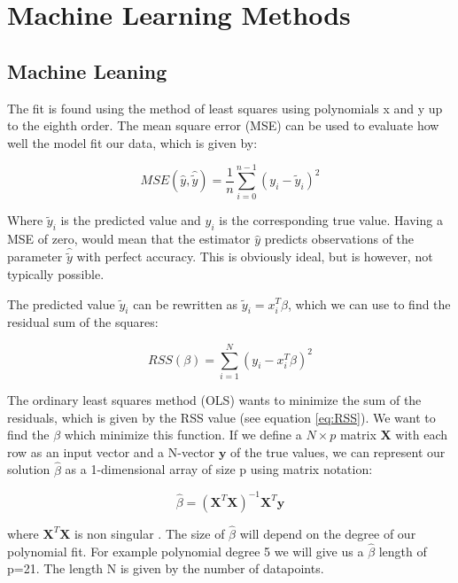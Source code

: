 \documentclass[a4paper, UKenglish, 11pt]{uiomaster}
\begin{document}
\chapter{Machine Learning Methods}

\section*{Machine Leaning}
The fit is found using the method of least squares using polynomials x and y up to the eighth order. The mean square error (MSE) can be used to evaluate how well the model fit our data, which is given by:

\begin{equation}
MSE(\hat{y},\hat{\tilde{y}}) = \frac{1}{n}
\sum_{i=0}^{n-1}(y_i-\tilde{y}_i)^2
\label{eq:MSE}
\end{equation}

Where $\tilde{y}_i$ is the predicted value and $y_i$ is the corresponding true value. Having a MSE of zero, would mean that the estimator $\hat{y}$ predicts observations of the parameter $\hat{\tilde{y}}$ with perfect accuracy. This is obviously ideal, but is however, not typically possible.

The predicted value $\tilde{y}_i$ can be rewritten as $\tilde{y}_i=x_i^T\beta$, which we can use to find the residual sum of the squares:

\begin{equation}
RSS(\beta) =
\sum_{i=1}^{N}(y_i-x_i^T\beta)^2
\label{eq:RSS}
\end{equation}

The ordinary least squares method (OLS) wants to minimize the sum of the residuals, which is given by the RSS value (see equation \ref{eq:RSS}). We want to find the $\beta$ which minimize this function. If we define a $N \times p$ matrix $\textbf{X}$ with each row as an input vector and a N-vector $\textbf{y}$ of the true values, we can represent our solution $\hat{\beta}$ as a 1-dimensional array of size p using matrix notation:

\begin{equation}
\hat{\beta}=(\textbf{X}^T\textbf{X})^{-1}\textbf{X}^T\textbf{y}
\label{eq:beta}
\end{equation}

where $\textbf{X}^T\textbf{X}$ is non singular \cite{94}. The size of $\hat{\beta}$ will depend on the degree of our polynomial fit. For example polynomial degree 5 we will give us a $\hat{\beta}$ length of p=21. The length N is given by the number of datapoints. %
\end{document}
